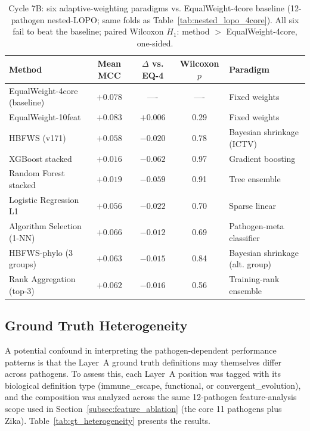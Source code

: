 \begin{table}[htbp]
\centering
\caption{Cycle 7B: six adaptive-weighting paradigms vs. EqualWeight-4core baseline (12-pathogen nested-LOPO; same folds as Table~\ref{tab:nested_lopo_4core}). All six fail to beat the baseline; paired Wilcoxon $H_1$: method $>$ EqualWeight-4core, one-sided.}
\label{tab:adaptive_weighting_comparison}
\small
\begin{tabular}{lcccl}
\toprule
\textbf{Method} & \textbf{Mean MCC} & \textbf{$\Delta$ vs. EQ-4} & \textbf{Wilcoxon $p$} & \textbf{Paradigm} \\
\midrule
EqualWeight-4core (baseline) & $+0.078$ & ----    & ----   & Fixed weights \\
EqualWeight-10feat           & $+0.083$ & $+0.006$ & 0.29  & Fixed weights \\
HBFWS (v171)                 & $+0.058$ & $-0.020$ & 0.78  & Bayesian shrinkage (ICTV) \\
\midrule
XGBoost stacked              & $+0.016$ & $-0.062$ & 0.97  & Gradient boosting \\
Random Forest stacked        & $+0.019$ & $-0.059$ & 0.91  & Tree ensemble \\
Logistic Regression L1       & $+0.056$ & $-0.022$ & 0.70  & Sparse linear \\
Algorithm Selection (1-NN)   & $+0.066$ & $-0.012$ & 0.69  & Pathogen-meta classifier \\
HBFWS-phylo (3 groups)       & $+0.063$ & $-0.015$ & 0.84  & Bayesian shrinkage (alt. group) \\
Rank Aggregation (top-3)     & $+0.062$ & $-0.016$ & 0.56  & Training-rank ensemble \\
\bottomrule
\end{tabular}
\end{table}


\subsection{Ground Truth Heterogeneity}
\label{subsec:gt_heterogeneity_results}

A potential confound in interpreting the pathogen-dependent performance patterns is that the Layer~A ground truth definitions may themselves differ across pathogens.
To assess this, each Layer~A position was tagged with its biological definition type (immune\_escape, functional, or convergent\_evolution), and the composition was analyzed across the same 12-pathogen feature-analysis scope used in Section~\ref{subsec:feature_ablation} (the core 11 pathogens plus Zika).
Table~\ref{tab:gt_heterogeneity} presents the results.

